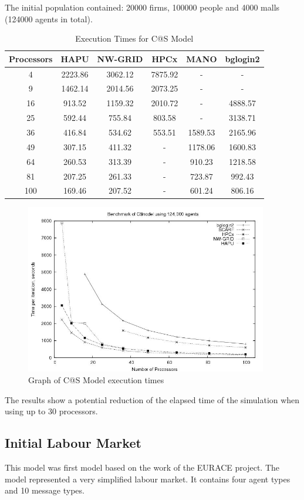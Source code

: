 The initial population contained: 20000 firms, 100000 people and 4000 malls (124000 agents in total).
{
\renewcommand{\arraystretch}{1.25}
\begin{table}[ht]
 \centering
  \begin{tabular}{c|ccccc}
 Processors &HAPU  &NW-GRID &HPCx  &MANO  &bglogin2 \\ \hline
4 &2223.86 &3062.12 &7875.92 &- &-      \\
9 &1462.14 &2014.56 &2073.25 &- &-      \\
16 &913.52 &1159.32 &2010.72 &- &4888.57        \\
25 &592.44 &755.84 &803.58 &- &3138.71  \\
36 &416.84 &534.62 &553.51 &1589.53 &2165.96    \\
49 &307.15 &411.32 &- &1178.06 &1600.83 \\
64 &260.53 &313.39 &- &910.23 &1218.58  \\
81 &207.25 &261.33 &- &723.87 &992.43   \\
100 &169.46 &207.52 &- &601.24 &806.16  \\

 \end{tabular}
 \caption{Execution Times for C@S Model}
 \label{tab:ExecutionTimesForC@S}
\end{table}
}
\bigskip
\begin{figure}[ht]
 \centering
  \includegraphics[width=300pt]{C@S2-graph.jpg}
 \caption{Graph of C@S Model execution times}
 \label{fig:C@S-graph}
\end{figure}
The results show a potential reduction of the elapsed time of the simulation when using up to 30 processors.



\subsection{Initial Labour Market}
This model was first model based on the work of the EURACE project. The model represented a very simplified labour market. It contains four agent types and 10 message types.

